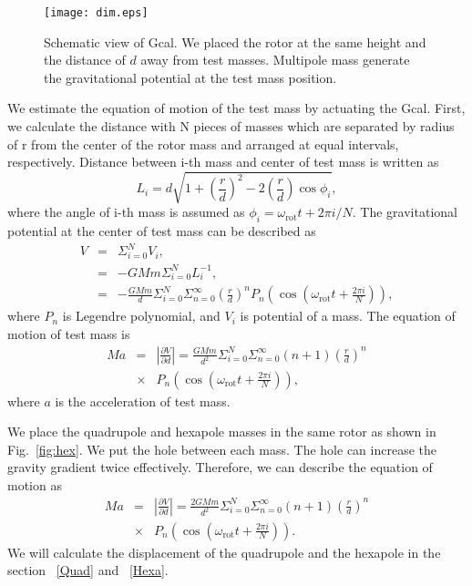 \documentclass[%
 reprint,
superscriptaddress,
 amsmath,amssymb,
 aps,
]{revtex4-1}
\begin{document}

\begin{figure}
\begin{center}
\texttt{[image: dim.eps]}
\caption{Schematic view of Gcal. We placed the rotor at  the same height and the distance of $d$ away from test masses. Multipole mass generate the gravitational potential at the test mass position.}
\label{fig:dim}
\end{center}
\end{figure}
We estimate the equation of motion of the test mass by actuating the Gcal.
First, we calculate the distance with N pieces of masses which are separated by radius of r from the center of the rotor mass and arranged at equal intervals, respectively.
Distance between i-th mass and center of test mass is written as
\begin{equation}
L_i=d \sqrt{1+\left( \frac{r}{d} \right)^2 -2\left( \frac{r}{d} \right) \cos{\phi_i} },
\end{equation}
where the angle of i-th mass is assumed as $\phi_i=\omega_{\mathrm{rot}} t + 2\pi i/N$.
The gravitational potential at the center of test mass can be described as
\begin{eqnarray}
V &=& \Sigma^N_{i=0} V_i, \\
&=& -GMm \Sigma^N_{i=0}L_i^{-1},\\
&=&-\frac{G\!M\!m\!}{d} \Sigma^N_{i=0} \Sigma^{\infty}_{n=0}\! \left(\! \frac{r}{d}\! \right)^n
\!P_n\! \left(\! \cos{\!\left( \! \omega_{\mathrm{rot}} t \!+\!\frac{2 \pi i}{N}\right)\!}\right),
\end{eqnarray}
where $P_n$ is Legendre polynomial, and $V_i$ is potential of a mass. The equation of motion of test mass is 
\begin{eqnarray}
Ma&=&\left| \frac{\partial V}{\partial{d}} \right| =\frac{GMm}{d^2}\Sigma^N_{i=0} \Sigma^{\infty}_{n=0}(n+1) \left( \frac{r}{d} \right)^n \nonumber \\
&\times& P_n\left(\cos{\left(\omega_{\mathrm{rot}} t +\frac{2 \pi i}{N}\right)}\right),
\end{eqnarray}
where $a$ is the acceleration of test mass. 

We place the quadrupole and hexapole masses in the same rotor as shown in Fig.~\ref{fig:hex}. We put the hole between each mass. The hole can increase the gravity gradient twice effectively. Therefore, we can describe the equation of motion as 
\begin{eqnarray}
Ma&=&\left| \frac{\partial V}{\partial{d}} \right| =\frac{2GMm}{d^2}\Sigma^N_{i=0} \Sigma^{\infty}_{n=0}(n+1) \left( \frac{r}{d} \right)^n \nonumber \\
&\times& P_n\left(\cos{\left(\omega_{\mathrm{rot}} t +\frac{2 \pi i}{N}\right)}\right). \label{eq:EOM}
\end{eqnarray}
We will calculate the displacement of the quadrupole and the hexapole in the section ~\ref{Quad}  and ~\ref{Hexa}.
\end{document}
